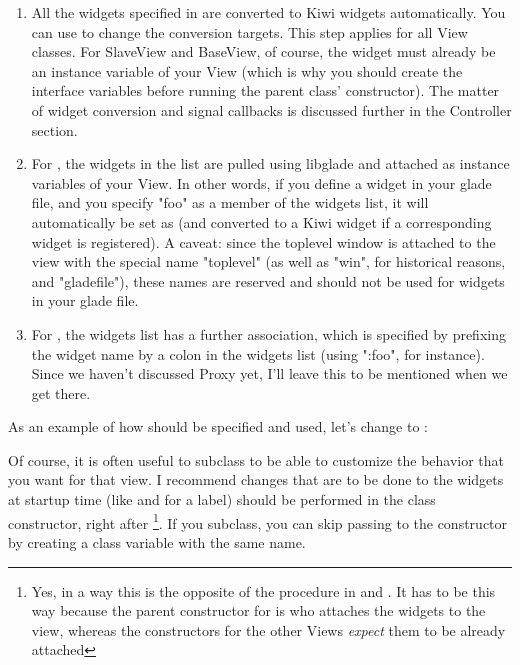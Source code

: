 \documentclass[a4paper]{howto}
\begin{document}
\begin{enumerate}
\item All the widgets specified in  are converted to
Kiwi widgets automatically. You can use 
to change the conversion targets. This step applies for all View
classes. For SlaveView and BaseView, of course, the widget must already
be an instance variable of your View (which is why you should create the
interface variables before running the parent class' constructor). The
matter of widget conversion and signal callbacks is discussed further
in the Controller section.

\item For , the widgets in the list are pulled using
libglade and attached as instance variables of your View. In other
words, if you define a widget  in your glade file, and you
specify "foo" as a member of the widgets list, it will automatically be
set as  (and converted to a Kiwi widget if a
corresponding widget is registered). A caveat: since the toplevel window
is attached to the view with the special name "toplevel" (as well as
"win", for historical reasons, and "gladefile"), these names are
reserved and should not be used for widgets in your glade file.

\item For , the widgets list has a further association,
which is specified by prefixing the widget name by a colon in the
widgets list (using ":foo", for instance). Since we haven't discussed
Proxy yet, I'll leave this to be mentioned when we get there.
\end{enumerate}

As an example of how  should be specified and used, let's
change  to :




Of course, it is often useful to subclass  to be able to
customize the behavior that you want for that view. I recommend
changes that are to be done to the widgets at startup time (like
 and  for a label) should be
performed in the class constructor, right after
\footnote{Yes, in a way this is the
opposite of the procedure in  and . It
has to be this way because the parent constructor for 
is who attaches the widgets to the view, whereas the constructors for the
other Views {\it expect} them to be already attached}. If you subclass,
you can skip passing  to the constructor by creating a class
variable with the same name.
\end{document}
